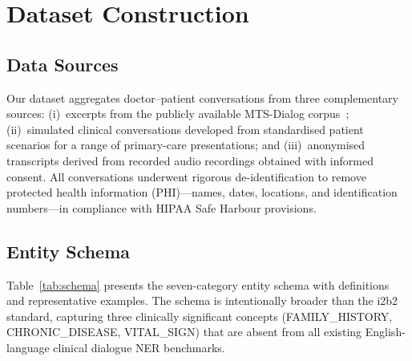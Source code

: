 \documentclass[conference]{IEEEtran}
\begin{document}
\section{Dataset Construction}
\label{sec:dataset}

\subsection{Data Sources}

Our dataset aggregates doctor–patient conversations from three complementary
sources: (i)~excerpts from the publicly available MTS-Dialog
corpus~\cite{abacha2023mtsdialog}; (ii)~simulated clinical conversations
developed from standardised patient scenarios for a range of primary-care
presentations; and (iii)~anonymised transcripts derived from recorded audio
recordings obtained with informed consent. All conversations underwent
rigorous de-identification to remove protected health information (PHI)—names,
dates, locations, and identification numbers—in compliance with HIPAA Safe
Harbour provisions.

\subsection{Entity Schema}

Table~\ref{tab:schema} presents the seven-category entity schema with
definitions and representative examples. The schema is intentionally broader
than the i2b2 standard, capturing three clinically significant concepts
(FAMILY\_HISTORY, CHRONIC\_DISEASE, VITAL\_SIGN) that are absent from all
existing English-language clinical dialogue NER benchmarks.
\end{document}
